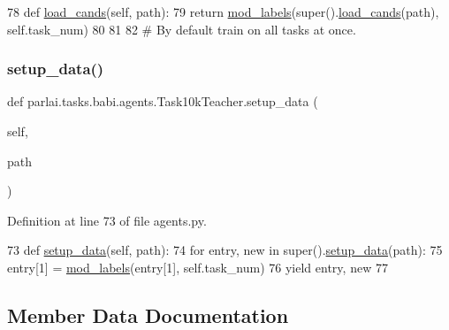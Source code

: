 \begin{DoxyCode}
78     \textcolor{keyword}{def }\hyperlink{namespaceparlai_1_1utils_1_1misc_ad935ab0a9d49b897c5e3efdbe1c46c4d}{load\_cands}(self, path):
79         \textcolor{keywordflow}{return} \hyperlink{namespaceparlai_1_1tasks_1_1babi_1_1agents_a80ee701751bc608fcb01bcfb1e884de0}{mod\_labels}(super().\hyperlink{namespaceparlai_1_1utils_1_1misc_ad935ab0a9d49b897c5e3efdbe1c46c4d}{load\_cands}(path), self.task\_num)
80 
81 
82 \textcolor{comment}{# By default train on all tasks at once.}
\end{DoxyCode}
\mbox{\label{classparlai_1_1tasks_1_1babi_1_1agents_1_1Task10kTeacher_a658de67a884d117c04f54e3f9d4bec4a}} 
\subsubsection{\texorpdfstring{setup\+\_\+data()}{setup\_data()}}
{\footnotesize\ttfamily def parlai.\+tasks.\+babi.\+agents.\+Task10k\+Teacher.\+setup\+\_\+data (\begin{DoxyParamCaption}\item[{}]{self,  }\item[{}]{path }\end{DoxyParamCaption})}



Definition at line 73 of file agents.\+py.


\begin{DoxyCode}
73     \textcolor{keyword}{def }\hyperlink{namespaceparlai_1_1tasks_1_1multinli_1_1agents_a4fa2cb0ba1ed745336ad8bceed36b841}{setup\_data}(self, path):
74         \textcolor{keywordflow}{for} entry, new \textcolor{keywordflow}{in} super().\hyperlink{namespaceparlai_1_1tasks_1_1multinli_1_1agents_a4fa2cb0ba1ed745336ad8bceed36b841}{setup\_data}(path):
75             entry[1] = \hyperlink{namespaceparlai_1_1tasks_1_1babi_1_1agents_a80ee701751bc608fcb01bcfb1e884de0}{mod\_labels}(entry[1], self.task\_num)
76             \textcolor{keywordflow}{yield} entry, new
77 
\end{DoxyCode}


\subsection{Member Data Documentation}
\mbox{\label{classparlai_1_1tasks_1_1babi_1_1agents_1_1Task10kTeacher_a71c66ccc1c27b22f0e49863c0926d59c}} 
